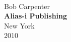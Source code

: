 \cleardoublepage
\pagestyle{empty}
\vspace*{1.125in}
\begin{center}
{\hfill {\fontsize{70}{100}\selectfont \bookname}}
\\[0.75in]
{\hfill {\Huge Bob Carpenter}}
\\[-1pt]
\vfill
{\hfill {\large\bf Alias-i Publishing}}
\\[1pt]
{\hfill {\small New York}}
\\[-1pt]
{\hfill {\small 2010}}
\end{center}
